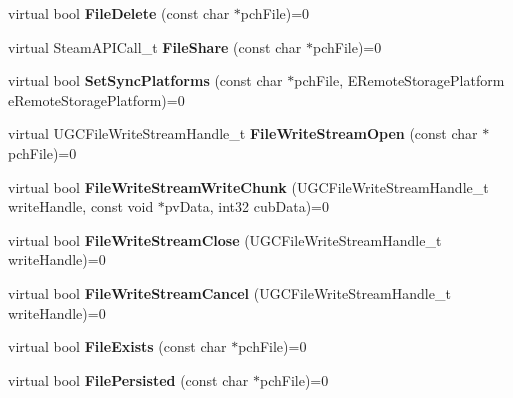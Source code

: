 \begin{DoxyCompactItemize}
virtual bool {\bfseries File\+Delete} (const char $\ast$pch\+File)=0
\item 
\mbox{\label{class_i_steam_remote_storage_a251f7b72fcd44853deebf9d38c09a7e8}} 
virtual Steam\+A\+P\+I\+Call\+\_\+t {\bfseries File\+Share} (const char $\ast$pch\+File)=0
\item 
\mbox{\label{class_i_steam_remote_storage_aa05d5c5a5b724c410b24f8cea017a61a}} 
virtual bool {\bfseries Set\+Sync\+Platforms} (const char $\ast$pch\+File, E\+Remote\+Storage\+Platform e\+Remote\+Storage\+Platform)=0
\item 
\mbox{\label{class_i_steam_remote_storage_aa88184d6151848c3bfb2f2cc4edda106}} 
virtual U\+G\+C\+File\+Write\+Stream\+Handle\+\_\+t {\bfseries File\+Write\+Stream\+Open} (const char $\ast$pch\+File)=0
\item 
\mbox{\label{class_i_steam_remote_storage_a6e4df6a98b25df3f53a138308d0ef4c8}} 
virtual bool {\bfseries File\+Write\+Stream\+Write\+Chunk} (U\+G\+C\+File\+Write\+Stream\+Handle\+\_\+t write\+Handle, const void $\ast$pv\+Data, int32 cub\+Data)=0
\item 
\mbox{\label{class_i_steam_remote_storage_a75cb2ddfcb360125c09ed0ae6a29ccd7}} 
virtual bool {\bfseries File\+Write\+Stream\+Close} (U\+G\+C\+File\+Write\+Stream\+Handle\+\_\+t write\+Handle)=0
\item 
\mbox{\label{class_i_steam_remote_storage_a94792c03e24373354c2923d727a8dc9d}} 
virtual bool {\bfseries File\+Write\+Stream\+Cancel} (U\+G\+C\+File\+Write\+Stream\+Handle\+\_\+t write\+Handle)=0
\item 
\mbox{\label{class_i_steam_remote_storage_a78c9e7b692b4d45e927357cfc050af5b}} 
virtual bool {\bfseries File\+Exists} (const char $\ast$pch\+File)=0
\item 
\mbox{\label{class_i_steam_remote_storage_a548e3c0cc219c178ad1650e72e114983}} 
virtual bool {\bfseries File\+Persisted} (const char $\ast$pch\+File)=0
\item 

\end{DoxyCompactItemize}
